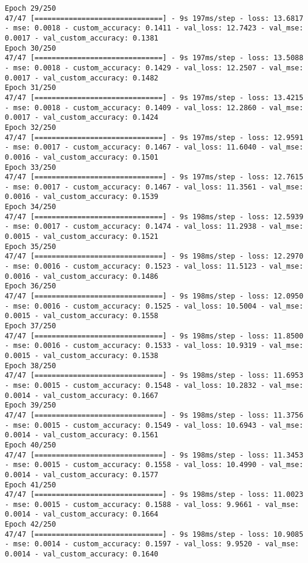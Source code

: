 \begin{lstlisting}
Epoch 29/250
47/47 [==============================] - 9s 197ms/step - loss: 13.6817 - mse: 0.0018 - custom_accuracy: 0.1411 - val_loss: 12.7423 - val_mse: 0.0017 - val_custom_accuracy: 0.1381
Epoch 30/250
47/47 [==============================] - 9s 197ms/step - loss: 13.5088 - mse: 0.0018 - custom_accuracy: 0.1429 - val_loss: 12.2507 - val_mse: 0.0017 - val_custom_accuracy: 0.1482
Epoch 31/250
47/47 [==============================] - 9s 197ms/step - loss: 13.4215 - mse: 0.0018 - custom_accuracy: 0.1409 - val_loss: 12.2860 - val_mse: 0.0017 - val_custom_accuracy: 0.1424
Epoch 32/250
47/47 [==============================] - 9s 197ms/step - loss: 12.9591 - mse: 0.0017 - custom_accuracy: 0.1467 - val_loss: 11.6040 - val_mse: 0.0016 - val_custom_accuracy: 0.1501
Epoch 33/250
47/47 [==============================] - 9s 197ms/step - loss: 12.7615 - mse: 0.0017 - custom_accuracy: 0.1467 - val_loss: 11.3561 - val_mse: 0.0016 - val_custom_accuracy: 0.1539
Epoch 34/250
47/47 [==============================] - 9s 198ms/step - loss: 12.5939 - mse: 0.0017 - custom_accuracy: 0.1474 - val_loss: 11.2938 - val_mse: 0.0015 - val_custom_accuracy: 0.1521
Epoch 35/250
47/47 [==============================] - 9s 198ms/step - loss: 12.2970 - mse: 0.0016 - custom_accuracy: 0.1523 - val_loss: 11.5123 - val_mse: 0.0016 - val_custom_accuracy: 0.1486
Epoch 36/250
47/47 [==============================] - 9s 198ms/step - loss: 12.0950 - mse: 0.0016 - custom_accuracy: 0.1525 - val_loss: 10.5004 - val_mse: 0.0015 - val_custom_accuracy: 0.1558
Epoch 37/250
47/47 [==============================] - 9s 198ms/step - loss: 11.8500 - mse: 0.0016 - custom_accuracy: 0.1533 - val_loss: 10.9319 - val_mse: 0.0015 - val_custom_accuracy: 0.1538
Epoch 38/250
47/47 [==============================] - 9s 198ms/step - loss: 11.6953 - mse: 0.0015 - custom_accuracy: 0.1548 - val_loss: 10.2832 - val_mse: 0.0014 - val_custom_accuracy: 0.1667
Epoch 39/250
47/47 [==============================] - 9s 198ms/step - loss: 11.3756 - mse: 0.0015 - custom_accuracy: 0.1549 - val_loss: 10.6943 - val_mse: 0.0014 - val_custom_accuracy: 0.1561
Epoch 40/250
47/47 [==============================] - 9s 198ms/step - loss: 11.3453 - mse: 0.0015 - custom_accuracy: 0.1558 - val_loss: 10.4990 - val_mse: 0.0014 - val_custom_accuracy: 0.1577
Epoch 41/250
47/47 [==============================] - 9s 198ms/step - loss: 11.0023 - mse: 0.0015 - custom_accuracy: 0.1588 - val_loss: 9.9661 - val_mse: 0.0014 - val_custom_accuracy: 0.1664
Epoch 42/250
47/47 [==============================] - 9s 198ms/step - loss: 10.9085 - mse: 0.0014 - custom_accuracy: 0.1597 - val_loss: 9.9520 - val_mse: 0.0014 - val_custom_accuracy: 0.1640

\end{lstlisting}
